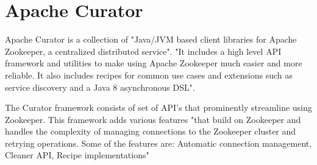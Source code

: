 \section{Apache Curator}

Apache Curator is a collection of "Java/JVM based client libraries for Apache Zookeeper,
a centralized distributed service"\cite{hid-sp18-514-apachecurator}.
"It includes a high level API framework and utilities to make using Apache Zookeeper much easier and more reliable. 
It also includes recipes for common use cases and extensions such as service discovery and a Java 8 asynchronous DSL"\cite{hid-sp18-514-apachecurator}.

The Curator framework consists of set of API’s that prominently streamline using Zookeeper. This framework adds various features 
"that build on Zookeeper and handles the complexity of managing connections to the Zookeeper cluster and retrying operations. 
Some of the features are: Automatic connection management, Cleaner API, Recipe implementations"\cite{hid-sp18-514-apachecuratorfeatures}

